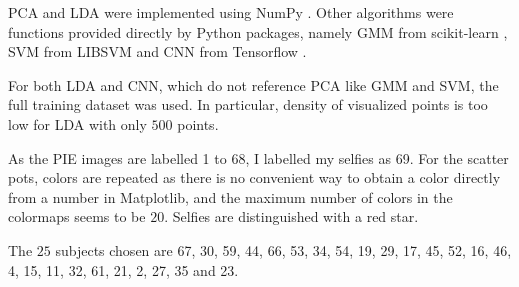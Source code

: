 \documentclass[a4paper]{exam}
\begin{document}
PCA and LDA were implemented using NumPy \cite{2020NumPy-Array}.
Other algorithms were functions provided directly by Python packages,
namely GMM from scikit-learn \cite{scikit-learn}, SVM from LIBSVM \cite{CC01a} and CNN from Tensorflow \cite{Abadi_TensorFlow_Large-scale_machine_2015}.

For both LDA and CNN, which do not reference PCA like GMM and SVM, the full training dataset was used.
In particular, density of visualized points is too low for LDA with only $500$ points.

As the PIE images are labelled 1 to 68, I labelled my selfies as 69.
For the scatter pots, colors are repeated as there is no convenient way to obtain a color directly from a number in Matplotlib,
and the maximum number of colors in the colormaps seems to be $20$. Selfies are distinguished with a red star.

The $25$ subjects chosen are 67, 30, 59, 44, 66, 53, 34, 54, 19, 29, 17, 45, 52, 16, 46,  4, 15,
11, 32, 61, 21,  2, 27, 35 and 23.
\end{document}
